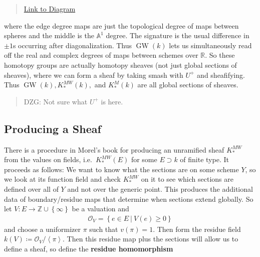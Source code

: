 \begin{quote}
\href{https://q.uiver.app/?q=WzAsNixbMCwwLCJbU157Mm59LCBTXnsybn1dIl0sWzAsMiwiXFxaWiJdLFsyLDIsIlxcR1coaykiXSxbMiwwLCJbXFxQUF5uIC9cXFBQXntuLTF9LH4gXFxQUF5uIC9cXFBQXntuLTF9XSAiXSxbNCwwLCJbU157bn0sIFNee259XSJdLFs0LDIsIlxcWloiXSxbMiw1LCJcXHRleHR7c2lnbmF0dXJlfSJdLFsyLDEsIlxcdGV4dHtyYW5rfSIsMl0sWzMsMCwiXFxDQ1xcZGFzaFxcdGV4dHtwb2ludHN9IiwyXSxbMyw0LCJcXFJSXFxkYXNoXFx0ZXh0e3BvaW50c30iXSxbNCw1LCJcXGRlZyJdLFswLDEsIlxcZGVnIl0sWzMsMiwiXFxkZWciXV0=}{Link
to Diagram}
\end{quote}

where the edge degree maps are just the topological degree of maps
between spheres and the middle is the \({\mathbb{A}}^1\) degree. The
signature is the usual difference in \(\pm 1\)s occurring after
diagonalization. Thus \({\operatorname{GW}}(k)\) lets us simultaneously
read off the real and complex degrees of maps between schemes over
\({\mathbb{R}}\). So these homotopy groups are actually homotopy sheaves
(not just global sections of sheaves), where we can form a sheaf by
taking smash with \(U^+\) and sheafifying. Thus
\({\operatorname{GW}}(k), K^{MW}_*(k),\) and \(K^M_*(k)\) are all global
sections of sheaves.

\begin{quote}
DZG: Not sure what \(U^+\) is here.
\end{quote}

\hypertarget{producing-a-sheaf}{%
\subsection{Producing a Sheaf}\label{producing-a-sheaf}}

There is a procedure in Morel's book for producing an unramified sheaf
\(K^{MW}_*\) from the values on fields, i.e.~\(K^{MW}_*(E)\) for some
\(E \supset k\) of finite type. It proceeds as follows: We want to know
what the sections are on some scheme \(Y\), so we look at its function
field and check \(K^{MW}_*\) on it to see which sections are defined
over all of \(Y\) and not over the generic point. This produces the
additional data of boundary/residue maps that determine when sections
extend globally. So let
\(V:E \to {\mathbb{Z}}\cup\left\{{\infty}\right\}\) be a valuation and
\begin{align*}
\mathcal O_V = \left\{{e\in E {~\mathrel{\Big|}~}V(e) \geq 0}\right\}
\end{align*}
and choose a uniformizer \(\pi\) such that \(v(\pi)=1\). Then form the
residue field
\(k(V) \coloneqq\mathcal O_V / \left\langle{\pi}\right\rangle\). Then
this residue map plus the sections will allow us to define a sheaf, so
define the \textbf{residue homomorphism}


